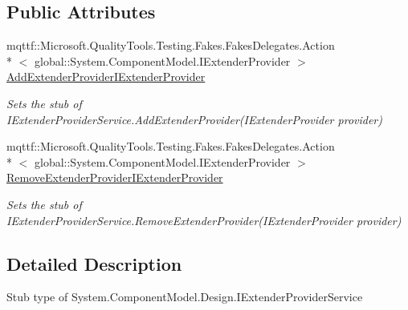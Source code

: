 \subsection*{Public Attributes}
\begin{DoxyCompactItemize}
\item 
mqttf\-::\-Microsoft.\-Quality\-Tools.\-Testing.\-Fakes.\-Fakes\-Delegates.\-Action\\*
$<$ global\-::\-System.\-Component\-Model.\-I\-Extender\-Provider $>$ \hyperlink{class_system_1_1_component_model_1_1_design_1_1_fakes_1_1_stub_i_extender_provider_service_a822f1f25d47123dc17ba27b070c2d22a}{Add\-Extender\-Provider\-I\-Extender\-Provider}
\begin{DoxyCompactList}\small\item\em Sets the stub of I\-Extender\-Provider\-Service.\-Add\-Extender\-Provider(\-I\-Extender\-Provider provider)\end{DoxyCompactList}\item 
mqttf\-::\-Microsoft.\-Quality\-Tools.\-Testing.\-Fakes.\-Fakes\-Delegates.\-Action\\*
$<$ global\-::\-System.\-Component\-Model.\-I\-Extender\-Provider $>$ \hyperlink{class_system_1_1_component_model_1_1_design_1_1_fakes_1_1_stub_i_extender_provider_service_a3a2d3c70011252b4e2556dcaf6d28147}{Remove\-Extender\-Provider\-I\-Extender\-Provider}
\begin{DoxyCompactList}\small\item\em Sets the stub of I\-Extender\-Provider\-Service.\-Remove\-Extender\-Provider(\-I\-Extender\-Provider provider)\end{DoxyCompactList}\end{DoxyCompactItemize}


\subsection{Detailed Description}
Stub type of System.\-Component\-Model.\-Design.\-I\-Extender\-Provider\-Service




